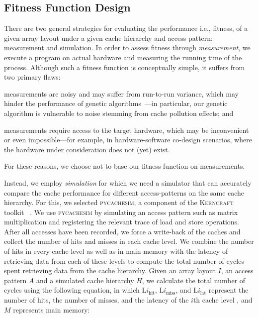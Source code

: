 \subsection{Fitness Function Design}

\label{sec:exploration:fitness}

There are two general strategies for evaluating the performance i.e., fitness, of a given array layout under a given cache hierarchy and access pattern: measurement and simulation. In order to assess fitness through \textit{measurement}, we execute a program on actual hardware and measuring the running time of the process. Although such a fitness function is conceptually simple, it suffers from two primary flaws:
\begin{enumerate*}
    \item measurements are noisy and may suffer from run-to-run variance, which may hinder the performance of genetic algorithms~\cite{miller1995genetic}---in particular, our genetic algorithm is vulnerable to noise stemming from cache pollution effects; and
    \item measurements require access to the target hardware, which may be inconvenient or even impossible---for example, in hardware-software co-design scenarios, where the hardware under consideration does not (yet) exist.
\end{enumerate*}
For these reasons, we choose not to base our fitness function on measurements. 

Instead, we employ \emph{simulation} for which we need a simulator that can accurately compare the cache performance for different access-patterns on the same cache hierarchy. 
For this, we selected \textsc{pycachesim}, a component of the \textsc{Kerncraft} toolkit~\cite{10.1007/978-3-319-56702-0_1}%
. We use \textsc{pycachesim} by simulating an access pattern such as matrix multiplication and registering the relevant trace of load and store operations. After all accesses have been recorded, we force a write-back of the caches and collect the number of hits and misses in each cache level. We combine the number of hits in every cache level as well as in main memory with the latency of retrieving data from each of these levels to compute the total number of cycles spent retrieving data from the cache hierarchy. Given an array layout $I$, an access pattern $A$ and a simulated cache hierarchy $H$, we calculate the total number of cycles using the following equation, in which $\mathrm{L}i_\mathrm{hit}$, $\mathrm{L}i_\mathrm{miss}$, and $\mathrm{L}i_\mathrm{lat}$ represent the number of hits, the number of misses, and the latency of the $i$th cache level%
, and $M$ represents main memory:

